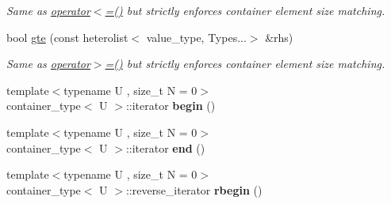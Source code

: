 \begin{DoxyCompactItemize}
\begin{DoxyCompactList}\small\item\em Same as \hyperlink{classheterogeneous_1_1heterolist_3_01_t_00_01_types_8_8_8_4_a204c33c94abb6900c42084f3c59e170b}{operator$<$=()} but strictly enforces container element size matching. \end{DoxyCompactList}\item 
\hypertarget{classheterogeneous_1_1heterolist_3_01_t_00_01_types_8_8_8_4_afe9c535fde9b180c5f7499e39fcf1ee4}{}bool \hyperlink{classheterogeneous_1_1heterolist_3_01_t_00_01_types_8_8_8_4_afe9c535fde9b180c5f7499e39fcf1ee4}{gte} (const heterolist$<$ value\+\_\+type, Types...$>$ \&rhs)\label{classheterogeneous_1_1heterolist_3_01_t_00_01_types_8_8_8_4_afe9c535fde9b180c5f7499e39fcf1ee4}

\begin{DoxyCompactList}\small\item\em Same as \hyperlink{classheterogeneous_1_1heterolist_3_01_t_00_01_types_8_8_8_4_a35f9216ddf8f6be30a27edfc456ee4a6}{operator$>$=()} but strictly enforces container element size matching. \end{DoxyCompactList}\item 
\hypertarget{classheterogeneous_1_1heterolist_3_01_t_00_01_types_8_8_8_4_a52f64a0faa3075aea61455fe8c88e714}{}{\footnotesize template$<$typename U , size\+\_\+t N = 0$>$ }\\container\+\_\+type$<$ U $>$\+::iterator {\bfseries begin} ()\label{classheterogeneous_1_1heterolist_3_01_t_00_01_types_8_8_8_4_a52f64a0faa3075aea61455fe8c88e714}

\item 
\hypertarget{classheterogeneous_1_1heterolist_3_01_t_00_01_types_8_8_8_4_a0211f5c94f6eb970f746e80e1830c21a}{}{\footnotesize template$<$typename U , size\+\_\+t N = 0$>$ }\\container\+\_\+type$<$ U $>$\+::iterator {\bfseries end} ()\label{classheterogeneous_1_1heterolist_3_01_t_00_01_types_8_8_8_4_a0211f5c94f6eb970f746e80e1830c21a}

\item 
\hypertarget{classheterogeneous_1_1heterolist_3_01_t_00_01_types_8_8_8_4_a44f4c20bf12980ae4fcf8540627e8c15}{}{\footnotesize template$<$typename U , size\+\_\+t N = 0$>$ }\\container\+\_\+type$<$ U $>$\+::reverse\+\_\+iterator {\bfseries rbegin} ()\label{classheterogeneous_1_1heterolist_3_01_t_00_01_types_8_8_8_4_a44f4c20bf12980ae4fcf8540627e8c15}


\end{DoxyCompactItemize}
